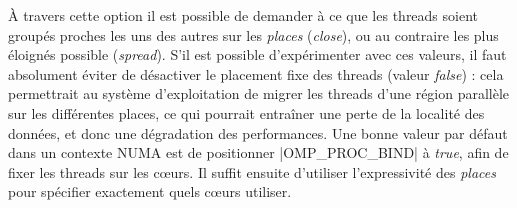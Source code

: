 À travers cette option il est possible de demander à ce que les threads soient groupés proches les uns des autres sur les \emph{places} (\emph{close}), ou au contraire les plus éloignés possible (\emph{spread}).
S'il est possible d'expérimenter avec ces valeurs, il faut absolument éviter de désactiver le placement fixe des threads (valeur \emph{false}) : cela permettrait au système d'exploitation de migrer les threads d'une région parallèle sur les différentes places, ce qui pourrait entraîner une perte de la localité des données, et donc une dégradation des performances.
Une bonne valeur par défaut dans un contexte NUMA est de positionner |OMP_PROC_BIND| à \emph{true}, afin de fixer les threads sur les cœurs.
Il suffit ensuite d'utiliser l'expressivité des \emph{places} pour spécifier exactement quels cœurs utiliser.

